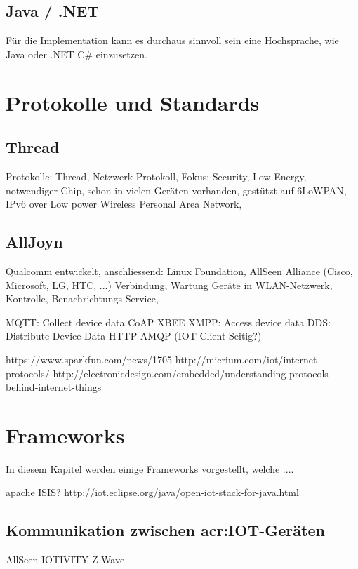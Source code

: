 \subsection{Java / .NET}
Für die Implementation kann es durchaus sinnvoll sein eine Hochsprache, wie Java oder .NET C\# einzusetzen. 

\section{Protokolle und Standards}

\subsection{Thread}
Protokolle: Thread, Netzwerk-Protokoll, Fokus: Security, Low Energy, notwendiger Chip, schon in vielen Geräten vorhanden, gestützt auf 6LoWPAN, IPv6 over Low power Wireless Personal Area Network, 


\subsection{AllJoyn}
Qualcomm entwickelt, anschliessend: Linux Foundation, AllSeen Alliance (Cisco, Microsoft, LG, HTC, ...)
Verbindung, Wartung Geräte in WLAN-Netzwerk, Kontrolle, Benachrichtungs Service, 

MQTT: Collect device data
CoAP
XBEE
XMPP: Access device data
DDS: Distribute Device Data
HTTP
AMQP (IOT-Client-Seitig?)

https://www.sparkfun.com/news/1705
http://micrium.com/iot/internet-protocols/
http://electronicdesign.com/embedded/understanding-protocols-behind-internet-things

\section{Frameworks}
In diesem Kapitel werden einige Frameworks vorgestellt, welche ....

apache ISIS?
http://iot.eclipse.org/java/open-iot-stack-for-java.html

\subsection{Kommunikation zwischen \gls{acr:IOT}-Geräten}
AllSeen
IOTIVITY
Z-Wave